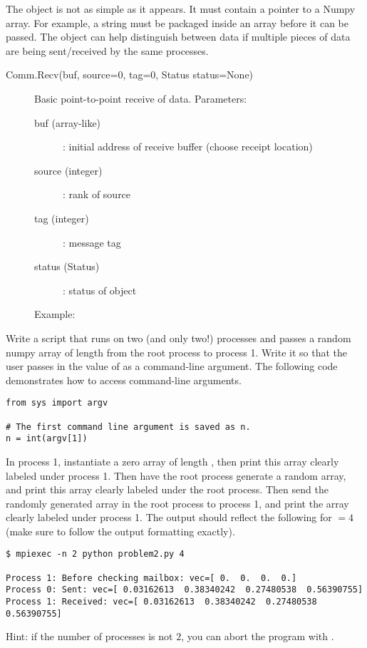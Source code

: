 The  object is not as simple as it appears. It must contain a pointer to a Numpy array. 
For example, a string must be packaged inside an array before it can be passed.
The  object can help distinguish between data if multiple pieces of data are being sent/received by the same processes.

\begin{description}
\item[Comm.Recv(buf, source=0, tag=0, Status status=None)]
Basic point-to-point receive of data.
Parameters:
\begin{description}
\item[buf (array-like)]: initial address of receive buffer (choose receipt location)
\item[source (integer)]: rank of source
\item[tag (integer)]: message tag
\item[status (Status)]: status of object
\end{description}
Example:

\end{description}

\begin{problem}
Write a script that runs on two (and only two!) processes and passes a random numpy array of length  from the root process to process 1.
Write it so that the user passes in the value of  as a command-line argument. 
The following code demonstrates how to access command-line arguments.
\begin{lstlisting}
from sys import argv
    
# The first command line argument is saved as n.
n = int(argv[1])
\end{lstlisting}
In process 1, instantiate a zero array of length , then print this array clearly labeled under process 1.
Then have the root process generate a random array, and print this array clearly labeled under the root process.
Then send the randomly generated array in the root process to process 1, and print the array clearly labeled under process 1.
    The output should reflect the following for  $ = 4$ (make sure to follow the output formatting exactly).
\begin{lstlisting}[style=ShellOutput]
$ mpiexec -n 2 python problem2.py 4

Process 1: Before checking mailbox: vec=[ 0.  0.  0.  0.]
Process 0: Sent: vec=[ 0.03162613  0.38340242  0.27480538  0.56390755]
Process 1: Received: vec=[ 0.03162613  0.38340242  0.27480538  0.56390755]
\end{lstlisting}

\noindent Hint: if the number of processes is not $2$, you can abort the program with .
\end{problem}

